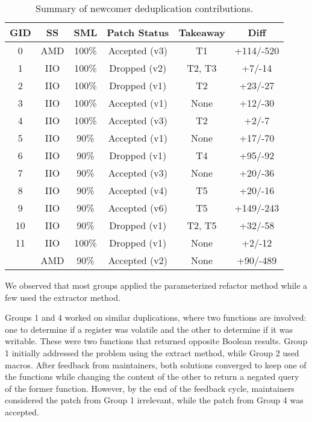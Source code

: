 \documentclass[10pt,conference]{IEEEtran}
\begin{document}
\begin{table}[ht]
\centering
\caption{Summary of newcomer deduplication contributions.}
\begin{tabular}{ |c |c |c |c |c | c| }
\hline
\textbf{GID} & \textbf{SS} & \textbf{SML} & \textbf{Patch Status} & \textbf{Takeaway} & \textbf{Diff} \\
\hline
0 & AMD & 100\% & Accepted (v3) & T1 & +114/-520 \\ \hline
1 & IIO & 100\% & Dropped (v2) & T2, T3 & +7/-14 \\ \hline
2 & IIO & 100\% & Dropped (v1) & T2 & +23/-27 \\ \hline
3 & IIO & 100\% & Accepted (v1) & None & +12/-30 \\ \hline
4 & IIO & 100\% & Accepted (v3) & T2 & +2/-7 \\ \hline
5 & IIO & 90\% & Accepted (v1) & None & +17/-70 \\ \hline
6 & IIO & 90\% & Dropped (v1) & T4 & +95/-92 \\ \hline
7 & IIO & 90\% & Accepted (v3) & None & +20/-36 \\ \hline
8 & IIO & 90\% & Accepted (v4) & T5 & +20/-16 \\ \hline
9 & IIO & 90\% & Accepted (v6) & T5 & +149/-243 \\ \hline
10 & IIO & 90\% & Dropped (v1) & T2, T5 & +32/-58 \\ \hline
11 & IIO & 100\% & Dropped (v1) & None & +2/-12 \\
   & AMD & 90\% & Accepted (v2) & None & +90/-489 \\ \hline

\end{tabular}%

\label{tab:stu}
\end{table}

We observed that most groups applied the parameterized refactor method while a few used the extractor method.

Groups 1 and 4 worked on similar duplications, where two functions are involved: one to determine if a register was volatile and the other to determine if it was writable. These were two functions that returned opposite Boolean results. Group 1 initially addressed the problem using the extract method, while Group 2 used macros. After feedback from maintainers, both solutions converged to keep one of the functions while changing the content of the other to return a negated query of the former function. However, by the end of the feedback cycle, maintainers considered the patch from Group 1 irrelevant, while the patch from Group 4 was accepted.
\end{document}
